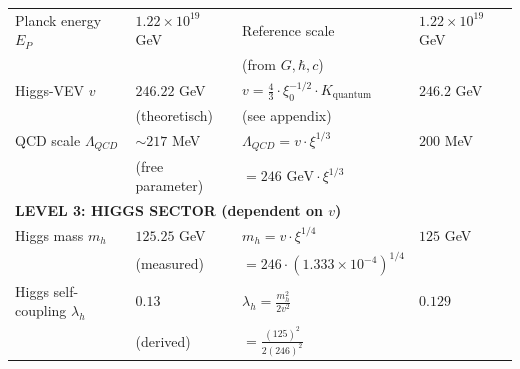 \begin{table}[htbp]
{\begin{tabular}{p{3.8cm}p{2.5cm}p{3.5cm}p{2.8cm}}
	Planck energy $E_P$ & $1.22 \times 10^{19}$ GeV & Reference scale & $1.22 \times 10^{19}$ GeV \\
	& & (from $G, \hbar, c$) & \\[0.3em]
	
Higgs-VEV $v$ & $246.22$ GeV & $v = \frac{4}{3} \cdot \xi_0^{-1/2} \cdot K_{\text{quantum}}$ & $246.2$ GeV \\
& (theoretisch) & (see appendix) & \\[0.3em]
	
	QCD scale $\Lambda_{QCD}$ & $\sim 217$ MeV & $\Lambda_{QCD} = v \cdot \xi^{1/3}$ & $200$ MeV \\
	& (free parameter) & $= 246 \text{ GeV} \cdot \xi^{1/3}$ & \\[0.3em]
	
	\midrule
	\multicolumn{4}{l}{\textbf{LEVEL 3: HIGGS SECTOR (dependent on $v$)}} \\
	\midrule
	
	Higgs mass $m_h$ & $125.25$ GeV & $m_h = v \cdot \xi^{1/4}$ & $125$ GeV \\
	& (measured) & $= 246 \cdot (1.333 \times 10^{-4})^{1/4}$ & \\[0.3em]
	
	Higgs self-coupling $\lambda_h$ & $0.13$ & $\lambda_h = \frac{m_h^2}{2v^2}$ & $0.129$ \\
	& (derived) & $= \frac{(125)^2}{2(246)^2}$ & \\[0.3em]
	
\end{tabular}%
}
\end{table}

